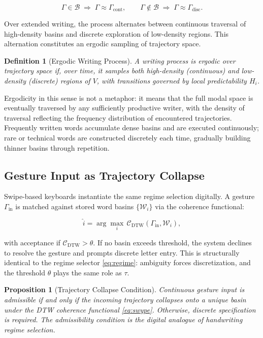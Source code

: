 \documentclass[12pt, a4paper]{article}
\newtheorem{definition}{Definition}
\newtheorem{proposition}{Proposition}
\begin{document}
\begin{equation}
\Gamma \in \mathcal{B} \;\Rightarrow\; \Gamma \approx \Gamma_{\mathrm{cont}},
\qquad
\Gamma \notin \mathcal{B} \;\Rightarrow\; \Gamma \approx \Gamma_{\mathrm{disc}}.
\label{eq:basinregime}
\end{equation}

Over extended writing, the process alternates between continuous traversal of high-density basins and discrete exploration of low-density regions. This alternation constitutes an ergodic sampling of trajectory space.

\begin{definition}[Ergodic Writing Process]
A writing process is \emph{ergodic over trajectory space} if, over time, it samples both high-density (continuous) and low-density (discrete) regions of $V$, with transitions governed by local predictability $H_i$.
\end{definition}

Ergodicity in this sense is not a metaphor: it means that the full modal space is eventually traversed by any sufficiently productive writer, with the density of traversal reflecting the frequency distribution of encountered trajectories. Frequently written words accumulate dense basins and are executed continuously; rare or technical words are constructed discretely each time, gradually building thinner basins through repetition.

\subsection{Gesture Input as Trajectory Collapse}

Swipe-based keyboards instantiate the same regime selection digitally. A gesture $\Gamma_{\mathrm{in}}$ is matched against stored word basins $\{\mathcal{W}_i\}$ via the coherence functional:

\begin{equation}
\hat{i} = \arg\max_i\, \mathcal{C}_{\mathrm{DTW}}(\Gamma_{\mathrm{in}}, \mathcal{W}_i),
\label{eq:swype}
\end{equation}

with acceptance if $\mathcal{C}_{\mathrm{DTW}} > \theta$. If no basin exceeds threshold, the system declines to resolve the gesture and prompts discrete letter entry. This is structurally identical to the regime selector \eqref{eq:regime}: ambiguity forces discretization, and the threshold $\theta$ plays the same role as $\tau$.

\begin{proposition}[Trajectory Collapse Condition]
Continuous gesture input is admissible if and only if the incoming trajectory collapses onto a unique basin under the DTW coherence functional \eqref{eq:swype}. Otherwise, discrete specification is required. The admissibility condition is the digital analogue of handwriting regime selection.
\end{proposition}
\end{document}
